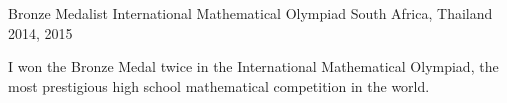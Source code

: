 


\begin{cventries}


	\cventry
	{Bronze Medalist} %
	{International Mathematical Olympiad} %
	{South Africa, Thailand} %
	{2014, 2015} %
	{ %
		\begin{cvitems}
		\item {I won the Bronze Medal twice in the International Mathematical Olympiad, the most prestigious high school mathematical competition in the world.}
		\end{cvitems}
	}

\end{cventries}
